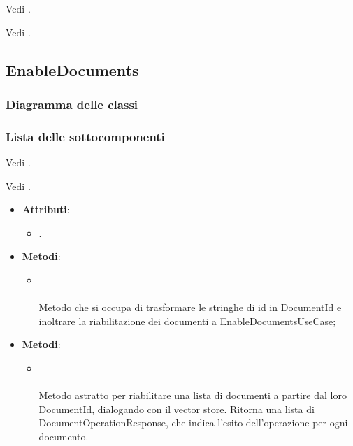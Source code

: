 \documentclass[10pt, a4paper]{article}
\begin{document}
Vedi .

Vedi .






\subsection{EnableDocuments}
\subsubsection{Diagramma delle classi}
\subsubsection{Lista delle sottocomponenti}




Vedi .


Vedi .


\label{EnableDocumentsControllerDettaglio}
\begin{itemize}
    \item \textbf{Attributi}:
    \begin{itemize}
        \item {}.
    \end{itemize}
    \item \textbf{Metodi}:
    \begin{itemize}
        \item {}\\ \\
        Metodo che si occupa di trasformare le stringhe di id in DocumentId e inoltrare la riabilitazione dei documenti a EnableDocumentsUseCase;
    \end{itemize}
\end{itemize}


\label{EnableDocumentsPortDettaglio}
\begin{itemize}
    \item \textbf{Metodi}:
    \begin{itemize}
        \item {}\\ \\
        Metodo astratto per riabilitare una lista di documenti a partire dal loro DocumentId, dialogando con il vector store. Ritorna una lista di DocumentOperationResponse, che indica l'esito dell'operazione per ogni documento.
    \end{itemize}
\end{itemize}
\end{document}

